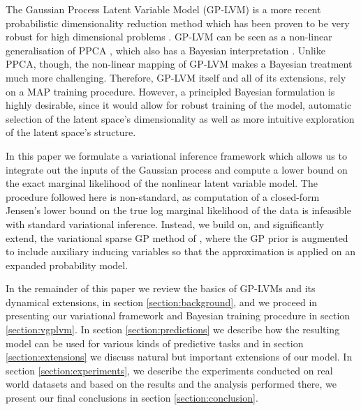 \par The Gaussian Process Latent Variable Model (GP-LVM) \citep{GPLVM} is a more recent probabilistic dimensionality 
reduction method which has been proven to be very robust for high dimensional problems 
\citep{gplvmLarger, Damianou:vgpds11}. GP-LVM can be seen 
as a non-linear generalisation of PPCA \citep{Tipping:probpca99}, which also has a
 Bayesian interpretation \citep{Bishop:bayesPCA98}. 
Unlike PPCA, though, the non-linear mapping of GP-LVM makes a Bayesian
treatment much more challenging.
Therefore, GP-LVM itself and all of its extensions, rely on a MAP training procedure.
 However, a principled Bayesian formulation is highly desirable, since it would allow for robust training of the model,
 automatic selection of the latent space's dimensionality as well as more intuitive exploration of the latent space's 
structure.

\par In this paper we formulate a variational inference framework which allows us to integrate out the inputs of the
Gaussian process and compute a lower bound on the exact marginal likelihood of the nonlinear latent variable model. The
procedure followed here is non-standard, as computation of a closed-form Jensen's lower bound on the true log marginal
 likelihood of the data is infeasible with standard variational inference. Instead, 
we build on, and significantly extend, the variational sparse GP method of \cite{Titsias:variational09}, where the GP prior is augmented to include auxiliary inducing variables so that the approximation is applied on an expanded probability model. 


\par In the remainder of this paper we review the basics of GP-LVMs and its dynamical extensions,
 in section \ref{section:background}, and we proceed in presenting our variational framework and 
 Bayesian training procedure in section \ref{section:vgplvm}. In section \ref{section:predictions} we
 describe how the resulting model can be used for various kinds of predictive tasks and in section \ref{section:extensions}
we discuss natural but important extensions of our model. In section \ref{section:experiments}, we
 describe the experiments conducted on real world datasets and based on the results and
the analysis performed there, we present our final conclusions
in section \ref{section:conclusion}.


